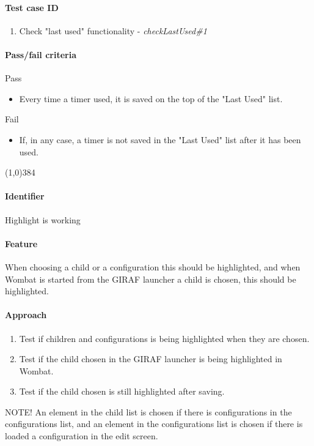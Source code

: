 \paragraph{Test case ID}
	\begin{enumerate}
		\item Check "last used" functionality - \textit{checkLastUsed\#1}
	\end{enumerate}
\paragraph{Pass/fail criteria}
	Pass
	\begin{itemize}
		\item Every time a timer used, it is saved on the top of the "Last Used" list.
	\end{itemize}
	Fail
	\begin{itemize}
		\item If, in any case, a timer is not saved in the "Last Used" list after it has been used.
	\end{itemize}
\begin{center}
	\line(1,0){384}
\end{center}

\paragraph{Identifier}
	Highlight is working
\paragraph{Feature}
	When choosing a child or a configuration this should be highlighted, and when Wombat is started from the GIRAF launcher a child is chosen, this should be highlighted.
\paragraph{Approach}
	\begin{enumerate} 
		\item Test if children and configurations is being highlighted when they are chosen.
		\item Test if the child chosen in the GIRAF launcher is being highlighted in Wombat.
		\item Test if the child chosen is still highlighted after saving.
	\end{enumerate}
	NOTE! An element in the child list is chosen if there is configurations in the configurations list, and an element in the configurations list is chosen if there is loaded a configuration in the edit screen.
